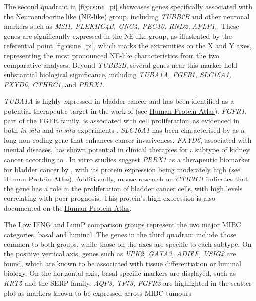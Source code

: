 The second quadrant in \cref{fig:cs:ne_pi} showcases genes specifically associated with the Neuroendocrine like (NE-like) group, including \textit{TUBB2B} and other neuronal markers such as \textit{MSI1, PLEKHG4B, GNG4, PEG10, RND2, APLP1,}\citep{Robertson2017-mg}. These genes are significantly expressed in the NE-like group, as illustrated by the referential point \cref{fig:cs:ne_pi}, which marks the extremities on the X and Y axes, representing the most pronounced NE-like characteristics from the two comparative analyses. Beyond \textit{TUBB2B}, several genes near this marker hold substantial biological significance, including \textit{TUBA1A, FGFR1, SLC16A1, FXYD6, CTHRC1,} and \textit{PRRX1}.

\textit{TUBA1A} is highly expressed in bladder cancer and has been identified as a potential therapeutic target in the work of \citet{Zhang2019-fk} (see \href{https://www.proteinatlas.org/ENSG00000167552-TUBA1A/tissue}{Human Protein Atlas}). \textit{FGFR1}, part of the FGFR family, is associated with cell proliferation, as evidenced in both \textit{in-situ} and \textit{in-situ} experiments \citet{Tomlinson2009-td}. \textit{SLC16A1} has been characterised by \citet{Logotheti2020-ya} as a long non-coding gene that enhances cancer invasiveness. \textit{FXYD6}, associated with mental diseases, has shown potential in clinical therapies for a subtype of kidney cancer according to \citet{Gao2014-sq}. In vitro studies suggest \textit{PRRX1} as a therapeutic biomarker for bladder cancer by \citet{Huang2022-ez}, with its protein expression being moderately high (see \href{https://www.proteinatlas.org/ENSG00000116132-PRRX1/tissue}{Human Protein Atlas}). Additionally, mouse research on \textit{CTHRC1} indicates that the gene has a role in the proliferation of bladder cancer cells, with high levels correlating with poor prognosis. This protein's high expression is also documented on the \href{https://www.proteinatlas.org/ENSG00000164932-CTHRC1/tissue}{Human Protein Atlas}.

The Low IFNG and LumP comparison groups represent the two major MIBC categories, basal and luminal. The genes in the third quadrant include those common to both groups, while those on the axes are specific to each subtype. On the positive vertical axis, genes such as \textit{UPK2, GATA3, ADIRF, VSIG2} are found, which are known to be associated with tissue differentiation or luminal biology. On the horizontal axis, basal-specific markers are displayed, such as \textit{KRT5} and the SERP family. \textit{AQP3, TP53, FGFR3} are highlighted in the scatter plot as markers known to be expressed across MIBC tumours.

